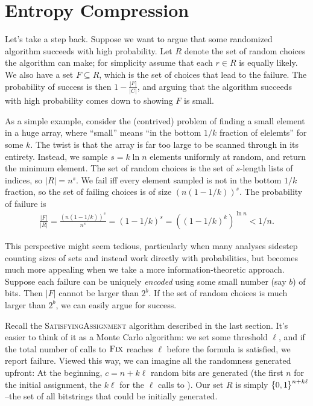 \documentclass[12pt]{article}
\begin{document}
\section{Entropy Compression}

Let's take a step back. Suppose we want to argue that some randomized algorithm
succeeds with high probability. Let $R$ denote the set of random choices the
algorithm can make; for simplicity assume that each $r \in R$ is equally likely.
We also have a set $F \subseteq R$, which is the set of choices that lead to the
failure. The probability of success is then $1 - \frac{|F|}{|C|}$, and arguing
that the algorithm succeeds with high probability comes down to showing $F$ is
small.

As a simple example, consider the (contrived) problem of finding a small element
in a huge array, where ``small'' means ``in the bottom $1/k$ fraction of
elelemts'' for some $k$. The twist is that the array is far too large to be
scanned through in its entirety. Instead, we sample $s = k\ln n$ elements
uniformly at random, and return the minimum element. The set of random choices
is the set of $s$-length lists of indices, so $|R| = n^s$. We fail iff every
element sampled is not in the bottom $1/k$ fraction, so the set of failing
choices is of size $(n(1 - 1/k))^s$. The probability of failure is
\begin{align*}
  \frac{|F|}{|R|} = \frac{(n(1 - 1/k))^s}{n^s}
                  = (1 - 1/k)^s
                  = ((1 - 1/k)^k)^{\ln n}
                  < 1/n.
\end{align*}

This perspective might seem tedious, particularly when many analyses sidestep
counting sizes of sets and instead work directly with probabilities, but becomes
much more appealing when we take a more information-theoretic approach. Suppose
each failure can be uniquely \emph{encoded} using some small number (say $b$) of
bits. Then $|F|$ cannot be larger than $2^b$. If the set of random choices is
much larger than $2^b$, we can easily argue for success.

Recall the \textsc{SatisfyingAssignment} algorithm described in the last
section. It's easier to think of it as a Monte Carlo algorithm: we set some
threshold $\ell$, and if the total number of calls to $\textsc{Fix}$ reaches $\ell$
before the formula is satisfied, we report failure. Viewed this way, we can
imagine all the randomness generated upfront: At the beginning, $c = n + k\ell$
random bits are generated (the first $n$ for the initial assignment, the $k\ell$
for the $\ell$ calls to \Fix). Our set $R$ is simply $\Set{0, 1}^{n+k\ell}$--the
set of all bitstrings that could be initially generated.
\end{document}
